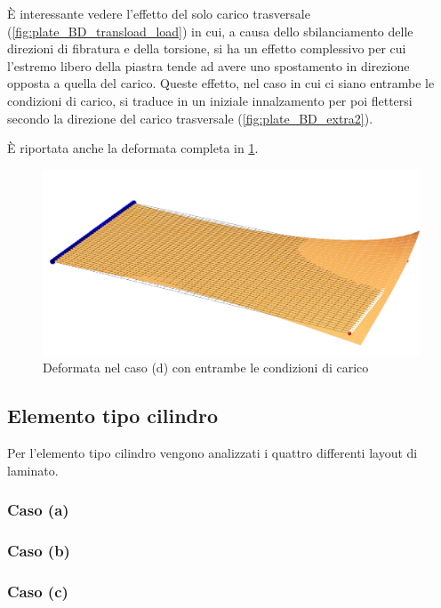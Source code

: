 \documentclass[a4paper,num-refs]{oup-contemporary}
\begin{document}
È interessante vedere l'effetto del solo carico trasversale (\cref{fig:plate_BD_transload_load}) in cui, a causa dello sbilanciamento delle direzioni di fibratura e della torsione, si ha un effetto complessivo per cui l'estremo libero della piastra tende ad avere uno spostamento in direzione opposta a quella del carico.  Queste effetto, nel caso in cui ci siano entrambe le condizioni di carico, si traduce in un iniziale innalzamento per poi flettersi secondo la direzione del carico trasversale (\cref{fig:plate_BD_extra2}). 

È riportata anche la deformata completa in \cref{fig:deformata_D}.

\begin{figure}[bt!]
		\includegraphics[width=\linewidth]{deformata_D.pdf}
	\caption{Deformata nel caso (d) con entrambe le condizioni di carico}
	\label{fig:deformata_D}
\end{figure}

\subsection{Elemento tipo cilindro}
Per l'elemento tipo cilindro vengono analizzati i quattro differenti layout di laminato.

\subsubsection{Caso (a)}
\textcolor{blue}{\lipsum[1-2]}
\subsubsection{Caso (b)}
\label{sec:cyl_B}
\textcolor{blue}{\lipsum[1-2]}
\subsubsection{Caso (c)}
\label{sec:cyl_C}
\textcolor{blue}{\lipsum[1-2]}
\end{document}
